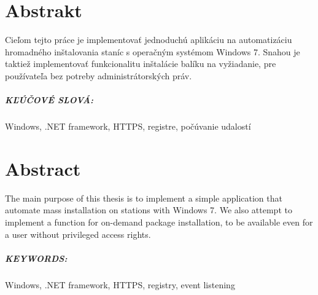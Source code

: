 \chapter*{Abstrakt}
Cieľom tejto práce je implementovať jednoduchú aplikáciu na automatizáciu hromadného inštalovania staníc s operačným systémom Windows 7. Snahou je taktiež implementovať funkcionalitu inštalácie balíku na vyžiadanie, pre používateľa bez  potreby administrátorských práv. 

\paragraph{KĽÚČOVÉ SLOVÁ:}
Windows, .NET framework, HTTPS, registre, počúvanie udalostí

\newpage
\chapter*{Abstract}
The main purpose of this thesis is to implement a simple application that automate mass installation on stations with Windows 7. We also attempt to implement a function for on-demand package installation, to be available even for a user without privileged access rights.

\paragraph{KEYWORDS:}
Windows, .NET framework, HTTPS, registry, event listening